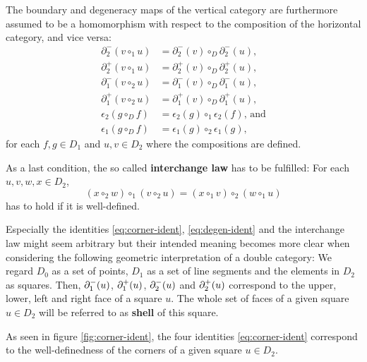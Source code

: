 \begin{defn}
The boundary and degeneracy maps of the vertical category are
furthermore assumed to be a homomorphism with respect to
the composition of the horizontal category, and vice versa:
\begin{equation} \label{eq:linear-ident}
\begin{aligned}
\partial^-_2(v \circ_1 u) &= \partial^-_2(v) \circ_D \partial^-_2(u)\text{,} \\
\partial^+_2(v \circ_1 u) &= \partial^+_2(v) \circ_D \partial^+_2(u)\text{,} \\
\partial^-_1(v \circ_2 u) &= \partial^-_1(v) \circ_D \partial^-_1(u)\text{,} \\
\partial^+_1(v \circ_2 u) &= \partial^+_1(v) \circ_D \partial^+_1(u)\text{,} \\
\epsilon_2(g \circ_D f) &= \epsilon_2(g) \circ_1 \epsilon_2(f)\text{, and} \\
\epsilon_1(g \circ_D f) &= \epsilon_1(g) \circ_2 \epsilon_1(g)\text{,}
\end{aligned}
\end{equation}
for each $f, g \in D_1$ and $u, v \in D_2$ where the compositions are defined.

As a last condition, the so called \textbf{interchange law} has to be fulfilled:
For each $u, v, w, x \in D_2$,
\begin{equation} \label{eq:interchange}
(x \circ_2 w) \circ_1 (v \circ_2 u) = (x \circ_1 v) \circ_2 (w \circ_1 u)
\end{equation}
has to hold if it is well-defined.
\end{defn}

Especially the identities \ref{eq:corner-ident}, \ref{eq:degen-ident} and the
interchange law might seem arbitrary but their intended meaning becomes more clear
when considering the following geometric interpretation of a double category: We
regard $D_0$ as a set of points, $D_1$ as a set of line segments and
the elements in $D_2$ as squares. Then, $\partial^-_1(u)$, $\partial^+_1(u)$, $\partial^-_2(u)$ and
$\partial^+_2(u)$ correspond to the upper, lower, left and right face of a square $u$.
The whole set of faces of a given square
$u \in D_2$ will be referred to as \textbf{shell} of this square.

As seen in figure \ref{fig:corner-ident}, the four identities \ref{eq:corner-ident}
correspond to the well-definedness of the corners of a given square $u \in D_2$.

